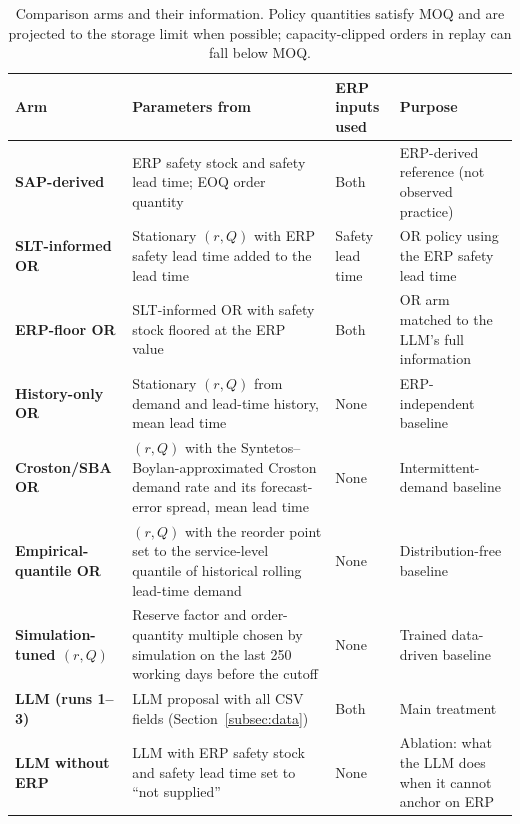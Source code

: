 \documentclass[preprint,12pt,nonatbib]{elsarticle}
\begin{document}
\begin{table}[htbp]
\centering
\caption{Comparison arms and their information. Policy quantities satisfy MOQ and are projected to the storage limit when possible; capacity-clipped orders in replay can fall below MOQ.}
\label{tab:arms}
\scriptsize
\setlength{\tabcolsep}{3pt}
\renewcommand{\arraystretch}{1.1}
\begin{tabularx}{\textwidth}{p{3.1cm} p{3.1cm} p{2.4cm} L}
\hline
\textbf{Arm} & \textbf{Parameters from} & \textbf{ERP inputs used} & \textbf{Purpose} \\
\hline
\textbf{SAP-derived} & ERP safety stock and safety lead time; EOQ order quantity & Both & ERP-derived reference (not observed practice) \\
\textbf{SLT-informed OR} & Stationary $(r,Q)$ with ERP safety lead time added to the lead time & Safety lead time & OR policy using the ERP safety lead time \\
\textbf{ERP-floor OR} & SLT-informed OR with safety stock floored at the ERP value & Both & OR arm matched to the LLM's full information \\
\textbf{History-only OR} & Stationary $(r,Q)$ from demand and lead-time history, mean lead time & None & ERP-independent baseline \\
\textbf{Croston/SBA OR} & $(r,Q)$ with the Syntetos--Boylan-approximated Croston demand rate and its forecast-error spread, mean lead time & None & Intermittent-demand baseline \\
\textbf{Empirical-quantile OR} & $(r,Q)$ with the reorder point set to the service-level quantile of historical rolling lead-time demand & None & Distribution-free baseline \\
\textbf{Simulation-tuned $(r,Q)$} & Reserve factor and order-quantity multiple chosen by simulation on the last 250 working days before the cutoff & None & Trained data-driven baseline \\
\textbf{LLM (runs 1--3)} & LLM proposal with all CSV fields (Section~\ref{subsec:data}) & Both & Main treatment \\
\textbf{LLM without ERP} & LLM with ERP safety stock and safety lead time set to ``not supplied'' & None & Ablation: what the LLM does when it cannot anchor on ERP \\
\hline
\end{tabularx}
\end{table}
\end{document}
